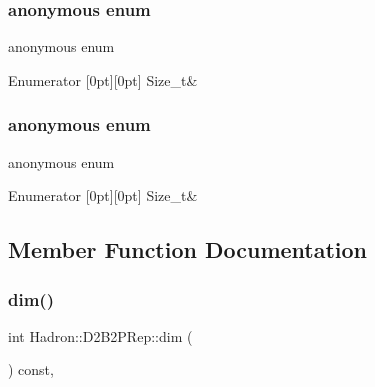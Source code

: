 \subsubsection{\texorpdfstring{anonymous enum}{anonymous enum}}
{\footnotesize\ttfamily anonymous enum}

\begin{DoxyEnumFields}{Enumerator}
[0pt][0pt]{}\mbox{\label{structHadron_1_1D2B2PRep_a227da1b67136e5379c03103817860e06a59eac7de031e346c2819ba31cc7f8384}} 
Size\+\_\+t&\\
\hline

\end{DoxyEnumFields}
\mbox{\label{structHadron_1_1D2B2PRep_a227da1b67136e5379c03103817860e06}} 
\subsubsection{\texorpdfstring{anonymous enum}{anonymous enum}}
{\footnotesize\ttfamily anonymous enum}

\begin{DoxyEnumFields}{Enumerator}
[0pt][0pt]{}\mbox{\label{structHadron_1_1D2B2PRep_a227da1b67136e5379c03103817860e06a59eac7de031e346c2819ba31cc7f8384}} 
Size\+\_\+t&\\
\hline

\end{DoxyEnumFields}


\subsection{Member Function Documentation}
\mbox{\label{structHadron_1_1D2B2PRep_a963b6a6af4da28f02cb06e9ebe7e0273}} 
\subsubsection{\texorpdfstring{dim()}{dim()}\hspace{0.1cm}{\footnotesize\ttfamily [1/2]}}
{\footnotesize\ttfamily int Hadron\+::\+D2\+B2\+P\+Rep\+::dim (\begin{DoxyParamCaption}{ }\end{DoxyParamCaption}) const\hspace{0.3cm}{\ttfamily [inline]}, {\ttfamily [virtual]}}


